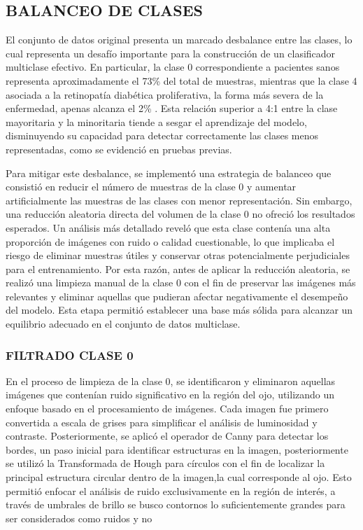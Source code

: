\subsection{BALANCEO DE CLASES}

El conjunto de datos original presenta un marcado desbalance entre las clases, lo cual
representa un desafío importante para la construcción de un clasificador multiclase
efectivo. En particular, la clase 0 correspondiente a pacientes sanos representa
aproximadamente el 73\% del total de muestras, mientras que la clase 4 asociada a la
retinopatía diabética proliferativa, la forma más severa de la enfermedad, apenas alcanza
el 2\% . Esta relación superior a 4:1 entre la clase mayoritaria y la minoritaria tiende a
sesgar el aprendizaje del modelo, disminuyendo su capacidad
para detectar correctamente las clases menos representadas, como se evidenció en pruebas
previas.

Para mitigar este desbalance, se implementó una estrategia de balanceo que consistió en
reducir el número de muestras de la clase 0 y aumentar artificialmente las muestras de las
clases con menor representación. Sin embargo, una reducción aleatoria directa del volumen
de la clase 0 no ofreció los resultados esperados. Un análisis más detallado reveló que
esta clase contenía una alta proporción de imágenes con ruido o calidad cuestionable, lo
que implicaba el riesgo de eliminar muestras útiles y conservar otras potencialmente
perjudiciales para el entrenamiento. Por esta razón, antes de aplicar la reducción
aleatoria, se realizó una limpieza manual de la clase 0 con el fin de preservar las
imágenes más relevantes y eliminar aquellas que pudieran afectar negativamente el
desempeño del modelo. Esta etapa permitió establecer una base más sólida para alcanzar un
equilibrio adecuado en el conjunto de datos multiclase.

\subsubsection{FILTRADO CLASE 0}

En el proceso de limpieza de la clase 0, se identificaron y eliminaron aquellas imágenes
que contenían ruido significativo en la región del ojo, utilizando un enfoque basado en el
procesamiento de imágenes. Cada imagen fue primero convertida a escala de grises para
simplificar el análisis de luminosidad y contraste. Posteriormente, se aplicó el operador
de Canny para detectar los bordes, un paso inicial para identificar estructuras en la
imagen, posteriormente se utilizó la Transformada de Hough para círculos con el fin de
localizar la principal estructura circular dentro de la imagen,la cual corresponde al ojo.
Esto permitió enfocar el análisis de ruido exclusivamente en la región de interés, a
través de umbrales de brillo se busco contornos lo suficientemente grandes para ser
considerados como ruidos y no

